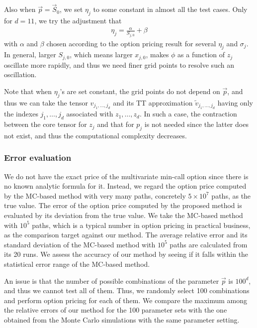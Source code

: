 Also when $\vec{p}=\vec{S}_0$, we set $\eta_j$ to some constant in almost all the test cases.
Only for $d=11$, we try the adjustment that
\begin{align}
    \eta_j = \frac{\alpha}{S_{j,0}} + \beta
    \label{eq:fitting_S0}
\end{align}
with $\alpha$ and $\beta$ chosen according to the option pricing result for several $\eta_j$ and $\sigma_j$.
In general, larger $S_{j,0}$, which means larger $x_{j,0}$, makes $\phi$ as a function of $z_j$ oscillate more rapidly, and thus we need finer grid points to resolve such an oscillation.

Note that when $\eta_j$'s are set constant, the grid points do not depend on $\vec{p}$, and thus we can take the tensor $\hat{v}_{j_1,\ldots,j_d}$ and its TT approximation $\tilde{v}_{j_1,\ldots,j_d}$ having only the indexes $j_1,\ldots,j_d$ associated with $z_1,\ldots,z_d$.
In such a case, the contraction between the core tensor for $z_j$ and that for $p_j$ is not needed since the latter does not exist, and thus the computational complexity decreases.  


\subsubsection*{Error evaluation}
We do not have the exact price of the multivariate min-call option since there is no known analytic formula for it.
Instead, we regard the option price computed by the MC-based method with very many paths, concretely $5 \times 10^7$ paths, as the true value.
The error of the option price computed by the proposed method is evaluated by its deviation from the true value.
We take the MC-based method with $10^5$ paths, which is a typical number in option pricing in practical business, as the comparison target against our method.
The average relative error and its standard deviation of the MC-based method with $10^5$ paths are calculated from its 20 runs.
We assess the accuracy of our method by seeing if it falls within the statistical error range of the MC-based method.

An issue is that the number of possible combinations of the parameter $\vec{p}$ is $100^d$, and thus we cannot test all of them.
Thus, we randomly select 100 combinations and perform option pricing for each of them. We compare the maximum among the relative errors of our method for the 100 parameter sets with the one obtained from the Monte Carlo simulations with the same parameter setting. 

